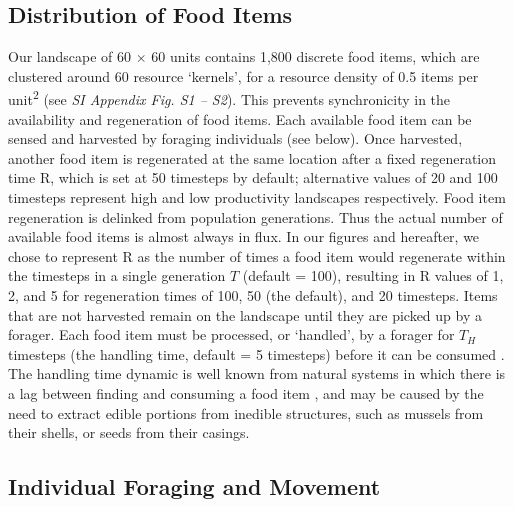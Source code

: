 \subsection*{Distribution of Food Items}

Our landscape of 60 $\times$ 60 units contains 1,800 discrete food items, which are clustered around 60 resource `kernels', for a resource density of 0.5 items per unit\textsuperscript{2} (see \textit{SI Appendix Fig. S1 -- S2}).
This prevents synchronicity in the availability and regeneration of food items.
Each available food item can be sensed and harvested by foraging individuals (see below).
Once harvested, another food item is regenerated at the same location after a fixed regeneration time R, which is set at 50 timesteps by default; alternative values of 20 and 100 timesteps represent high and low productivity landscapes respectively.
Food item regeneration is delinked from population generations.
Thus the actual number of available food items is almost always in flux.
In our figures and hereafter, we chose to represent R as the number of times a food item would regenerate within the timesteps in a single generation $T$ (default = 100), resulting in R values of 1, 2, and 5 for regeneration times of 100, 50 (the default), and 20 timesteps.
Items that are not harvested remain on the landscape until they are picked up by a forager.
Each food item must be processed, or `handled', by a forager for $T_H$ timesteps (the handling time, default = 5 timesteps) before it can be consumed \autocite{ruxton1992,gupte2021a}.
The handling time dynamic is well known from natural systems in which there is a lag between finding and consuming a food item \autocite{ruxton1992}, and may be caused by the need to extract edible portions from inedible structures, such as mussels from their shells, or seeds from their casings.

\subsection*{Individual Foraging and Movement}

